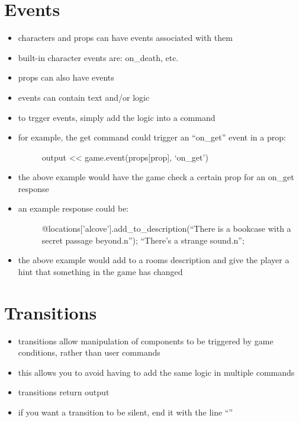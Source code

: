 \documentclass[letterpaper,10pt,english]{manual}
\begin{document}
\section{Events}
\begin{itemize}
\item {} 
characters and props can have events associated with them

\item {} 
built-in character events are: on\_death, etc.

\item {} 
props can also have events

\item {} 
events can contain text and/or logic

\item {} 
to trgger events, simply add the logic into a command

\item {} \begin{description}
\item[for example, the get command could trigger an ``on\_get'' event in a prop:] \leavevmode
output \textless{}\textless{} game.event(props{[}prop{]}, `on\_get')

\end{description}

\item {} 
the above example would have the game check a certain prop for an on\_get response

\item {} \begin{description}
\item[an example response could be:] \leavevmode
@locations{[}'alcove'{]}.add\_to\_description(``There is a bookcase with a secret passage beyond.n''); ``There's a strange sound.n'';

\end{description}

\item {} 
the above example would add to a rooms description and give the player a hint that something in the game has changed

\end{itemize}


\section{Transitions}
\begin{itemize}
\item {} 
transitions allow manipulation of components to be triggered by game conditions, rather than user commands

\item {} 
this allows you to avoid having to add the same logic in multiple commands

\item {} 
transitions return output

\item {} 
if you want a transition to be silent, end it with the line ``''

\end{itemize}
\end{document}
